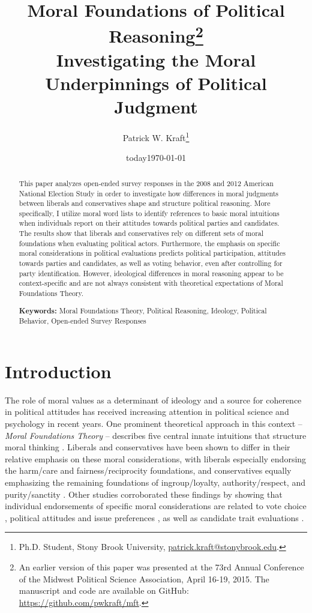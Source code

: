 \documentclass[12pt]{paper}
\author{Patrick W. Kraft\footnote{Ph.D. Student, Stony Brook University, \href{mailto:patrick.kraft@stonybrook.edu}{patrick.kraft@stonybrook.edu}.
}}
\date{today}
\title{Moral Foundations of Political Reasoning\footnote{An earlier version of this paper was presented at the 73rd Annual Conference of the Midwest Political Science Association, April 16-19, 2015. The manuscript and code are available on GitHub: \url{https://github.com/pwkraft/mft}.}\\
\large{Investigating the Moral Underpinnings of Political Judgment}}
\date{\today}
\begin{document}
\maketitle
\doublespacing

\begin{abstract}
This paper analyzes open-ended survey responses in the 2008 and 2012 American National Election Study in order to investigate how differences in moral judgments between liberals and conservatives shape and structure political reasoning. More specifically, I utilize moral word lists to identify references to basic moral intuitions when individuals report on their attitudes towards political parties and candidates. The results show that liberals and conservatives rely on different sets of moral foundations when evaluating political actors. Furthermore, the emphasis on specific moral considerations in political evaluations predicts political participation, attitudes towards parties and candidates, as well as voting behavior, even after controlling for party identification. However, ideological differences in moral reasoning appear to be context-specific and are not always consistent with theoretical expectations of Moral Foundations Theory.

\vspace{\baselineskip}
\noindent \textbf{Keywords:} Moral Foundations Theory, Political Reasoning, Ideology, Political Behavior, Open-ended Survey Responses
\end{abstract}
\newpage


\section{Introduction}

The role of moral values as a determinant of ideology and a source for coherence in political attitudes has received increasing attention in political science and psychology in recent years. One prominent theoretical approach in this context -- \textit{Moral Foundations Theory} -- describes five central innate intuitions that structure moral thinking \citep{haidt2008moral}. Liberals and conservatives have been shown to differ in their relative emphasis on these moral considerations, with liberals especially endorsing the harm/care and fairness/reciprocity foundations, and conservatives equally emphasizing the remaining foundations of ingroup/loyalty, authority/respect, and purity/sanctity \citep{graham2009liberals}. Other studies corroborated these findings by showing that individual endorsements of specific moral considerations are related to vote choice \citep{iyer2010beyond, franks2015using}, political attitudes and issue preferences \citep{koleva2012tracing, low2015moral, clifford2015concerns}, as well as candidate trait evaluations \citep{clifford2014linking}.
\end{document}
